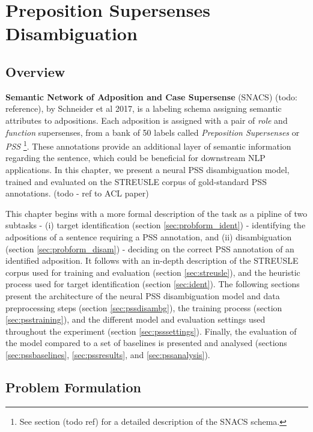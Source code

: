 
\chapter{Preposition Supersenses Disambiguation} %

\label{Chapter2} %

\section{Overview}
\textbf{Semantic Network of Adposition and Case Supersense} (SNACS) (todo: reference), by Schneider et al 2017, is a labeling schema assigning semantic attributes to adpositions. Each adposition is assigned with a pair of \emph{role} and \emph{function} supersenses, from a bank of 50 labels called \emph{Preposition Supersenses} or \emph{PSS} \footnote{See section (todo ref) for a detailed description of the SNACS schema.}. These annotations provide an additional layer of semantic information regarding the sentence, which could be beneficial for downstream NLP applications. In this chapter, we present a neural PSS disambiguation model, trained and evaluated on the STREUSLE corpus of gold-standard PSS annotations. (todo - ref to ACL paper)

This chapter begins with a more formal description of the task as a pipline of two subtasks - (i) target identification (section \ref{sec:probform_ident}) - identifying the adpositions of a sentence requiring a PSS annotation, and (ii) disambiguation (section \ref{sec:probform_disam}) - deciding on the correct PSS annotation of an identified adposition. It follows with an in-depth description of the STREUSLE corpus used for training and evaluation (section \ref{sec:streusle}), and the heuristic process used for target identification (section \ref{sec:ident}). The following sections present the architecture of the neural PSS disambiguation model and data preprocessing steps (section \ref{sec:pssdisambg}), the training process (section \ref{sec:psstraining}), and the different model and evaluation settings used throughout the experiment (section \ref{sec:psssettings}).  Finally, the evaluation of the model compared to a set of baselines is presented and analysed (sections \ref{sec:pssbaselines}, \ref{sec:pssresults}, and \ref{sec:pssanalysis}).

\section{Problem Formulation} \label{sec:probform}
